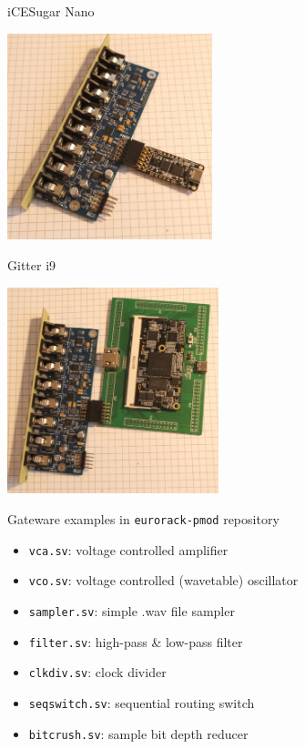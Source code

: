 \documentclass{beamer}
\begin{document}
\begin{frame}{iCESugar Nano}

\begin{center}
    \includegraphics[height=6cm]{img/icesugar_nano.png}
\end{center}

\end{frame}

\begin{frame}{Gitter i9}

\begin{center}
    \includegraphics[height=6cm]{img/gitter_i9.png}
\end{center}

\end{frame}

\begin{frame}{Gateware examples in \texttt{eurorack-pmod} repository}

    \begin{itemize}
        \item \texttt{vca.sv}: voltage controlled amplifier
        \item \texttt{vco.sv}: voltage controlled (wavetable) oscillator
        \item \texttt{sampler.sv}: simple .wav file sampler
        \item \texttt{filter.sv}: high-pass \& low-pass filter
        \item \texttt{clkdiv.sv}: clock divider
        \item \texttt{seqswitch.sv}: sequential routing switch
        \item \texttt{bitcrush.sv}: sample bit depth reducer
    \end{itemize}

\end{frame}
\end{document}
